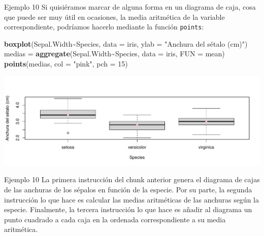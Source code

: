 \documentclass[
  ignorenonframetext,
]{beamer}
\newenvironment{Shaded}{\begin{snugshade}}{\end{snugshade}}
\newcommand{\AttributeTok}[1]{\textcolor[rgb]{0.13,0.29,0.53}{#1}}
\newcommand{\DecValTok}[1]{\textcolor[rgb]{0.00,0.00,0.81}{#1}}
\newcommand{\FunctionTok}[1]{\textcolor[rgb]{0.13,0.29,0.53}{\textbf{#1}}}
\newcommand{\NormalTok}[1]{#1}
\newcommand{\OtherTok}[1]{\textcolor[rgb]{0.56,0.35,0.01}{#1}}
\newcommand{\SpecialCharTok}[1]{\textcolor[rgb]{0.81,0.36,0.00}{\textbf{#1}}}
\newcommand{\StringTok}[1]{\textcolor[rgb]{0.31,0.60,0.02}{#1}}
\begin{document}
\begin{frame}[fragile]{Ejemplo 10}
\label{ejemplo-10-1}
Si quisiéramos marcar de alguna forma en un diagrama de caja, cosa que
puede ser muy útil en ocasiones, la media aritmética de la variable
correspondiente, podríamos hacerlo mediante la función \texttt{points}:

\begin{Shaded}
\begin{Highlighting}[]
\FunctionTok{boxplot}\NormalTok{(Sepal.Width}\SpecialCharTok{\textasciitilde{}}\NormalTok{Species, }\AttributeTok{data =}\NormalTok{ iris, }\AttributeTok{ylab =} \StringTok{"Anchura del sétalo (cm)"}\NormalTok{)}
\NormalTok{medias }\OtherTok{=} \FunctionTok{aggregate}\NormalTok{(Sepal.Width}\SpecialCharTok{\textasciitilde{}}\NormalTok{Species, }\AttributeTok{data =}\NormalTok{ iris, }\AttributeTok{FUN =}\NormalTok{ mean)}
\FunctionTok{points}\NormalTok{(medias, }\AttributeTok{col =} \StringTok{"pink"}\NormalTok{, }\AttributeTok{pch =} \DecValTok{15}\NormalTok{)}
\end{Highlighting}
\end{Shaded}

\includegraphics[width=0.8\linewidth]{R_base_files/figure-beamer/unnamed-chunk-192-1}
\end{frame}

\begin{frame}{Ejemplo 10}
\label{ejemplo-10-2}
La primera instrucción del chunk anterior genera el diagrama de cajas de
las anchuras de los sépalos en función de la especie. Por su parte, la
segunda instrucción lo que hace es calcular las medias aritméticas de
las anchuras según la especie. Finalmente, la tercera instrucción lo que
hace es añadir al diagrama un punto cuadrado a cada caja en la ordenada
correspondiente a su media aritmética.
\end{frame}
\end{document}
